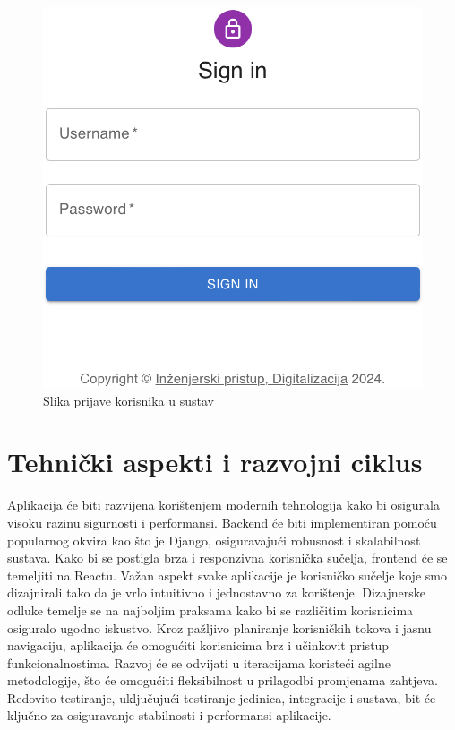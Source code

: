 		\begin{figure}[H]
			\includegraphics[width=\textwidth]{slike/slika_prijave.png}
			\caption{Slika prijave korisnika u sustav}
			\label{fig:slika_prijave}
		\end{figure}

		\section{Tehnički aspekti i razvojni ciklus}

		Aplikacija  će biti razvijena korištenjem modernih tehnologija kako bi osigurala visoku razinu sigurnosti i performansi. Backend će biti implementiran pomoću popularnog okvira kao što je Django, osiguravajući robusnost i skalabilnost sustava. Kako bi se postigla brza i responzivna korisnička sučelja, frontend će se temeljiti na Reactu.
		Važan aspekt svake aplikacije je korisničko sučelje koje smo dizajnirali tako da je vrlo intuitivno i jednostavno za korištenje. 
		Dizajnerske odluke temelje se na najboljim praksama kako bi se različitim korisnicima osiguralo ugodno iskustvo.
		Kroz pažljivo planiranje korisničkih tokova i jasnu navigaciju, aplikacija će omogućiti korisnicima brz i učinkovit pristup funkcionalnostima.
		Razvoj će se odvijati u iteracijama koristeći agilne metodologije, što će omogućiti fleksibilnost u prilagodbi promjenama zahtjeva. Redovito testiranje, uključujući testiranje jedinica, integracije i sustava, bit će ključno za osiguravanje stabilnosti i performansi aplikacije.
		

